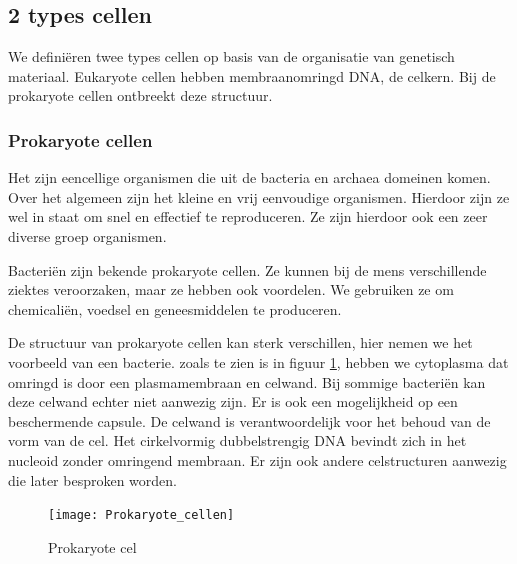 \documentclass[a4paper,kul]{kulakarticle} %
\begin{document}
\subsection{2 types cellen}
We definiëren twee types cellen op basis van de organisatie van genetisch materiaal. Eukaryote cellen hebben membraanomringd DNA, de celkern. Bij de prokaryote cellen ontbreekt deze structuur.  
\subsubsection{Prokaryote cellen}
Het zijn eencellige organismen die uit de bacteria en archaea domeinen komen. Over het algemeen zijn het kleine en vrij eenvoudige organismen. Hierdoor zijn ze wel in staat om snel en effectief te reproduceren. Ze zijn hierdoor ook een zeer diverse groep organismen. 

Bacteriën zijn bekende prokaryote cellen. Ze kunnen bij de mens verschillende ziektes veroorzaken, maar ze hebben ook voordelen. We gebruiken ze om chemicaliën, voedsel en geneesmiddelen te produceren. 

De structuur van prokaryote cellen kan sterk verschillen, hier nemen we het voorbeeld van een bacterie. zoals te zien is in figuur \ref{fig:prokaryotecellen}, hebben we cytoplasma dat omringd is door een plasmamembraan en celwand. Bij sommige bacteriën kan deze celwand echter niet aanwezig zijn. Er is ook een mogelijkheid op een beschermende capsule. De celwand is verantwoordelijk voor het behoud van de vorm van de cel. Het cirkelvormig dubbelstrengig DNA bevindt zich in het nucleoid zonder omringend membraan. Er zijn ook andere celstructuren aanwezig die later besproken worden.
 

\begin{figure}[h]
	\centering
	\texttt{[image: Prokaryote\_cellen]}
	\caption[Prokaryote cel]{Prokaryote cel}
	\label{fig:prokaryotecellen}
\end{figure}
\newpage
\end{document}
